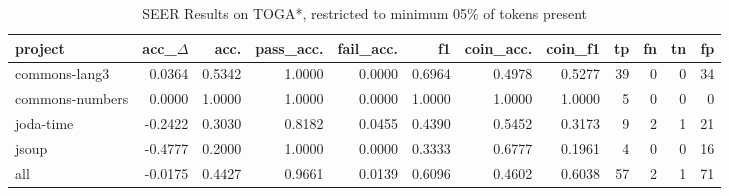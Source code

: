 \begin{table*}
\centering
\caption{SEER Results on TOGA*, restricted to minimum 05\% of tokens present}
\label{tab:toga_results_05}
\begin{tabular}{lrrrrrrrrrrr}
\toprule
         project &  acc\_$\Delta$ &    acc. &  pass\_acc. &  fail\_acc. &      f1 &  coin\_acc. &  coin\_f1 &  tp &  fn &  tn &  fp \\
\midrule
   commons-lang3 &      0.0364 &  0.5342 &     1.0000 &     0.0000 &  0.6964 &     0.4978 &   0.5277 &  39 &   0 &   0 &  34 \\
 commons-numbers &      0.0000 &  1.0000 &     1.0000 &     0.0000 &  1.0000 &     1.0000 &   1.0000 &   5 &   0 &   0 &   0 \\
       joda-time &     -0.2422 &  0.3030 &     0.8182 &     0.0455 &  0.4390 &     0.5452 &   0.3173 &   9 &   2 &   1 &  21 \\
           jsoup &     -0.4777 &  0.2000 &     1.0000 &     0.0000 &  0.3333 &     0.6777 &   0.1961 &   4 &   0 &   0 &  16 \\
             all &     -0.0175 &  0.4427 &     0.9661 &     0.0139 &  0.6096 &     0.4602 &   0.6038 &  57 &   2 &   1 &  71 \\
\bottomrule
\end{tabular}
\end{table*}
